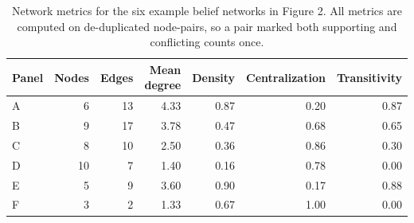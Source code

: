 \begin{table}
\caption{Network metrics for the six example belief networks in Figure 2. All metrics are computed on de-duplicated node-pairs, so a pair marked both supporting and conflicting counts once.}
\label{tab:figure2_examples}
\begin{tabular}{lrrrrrr}
\toprule
Panel & Nodes & Edges & Mean degree & Density & Centralization & Transitivity \\
\midrule
A & 6 & 13 & 4.33 & 0.87 & 0.20 & 0.87 \\
B & 9 & 17 & 3.78 & 0.47 & 0.68 & 0.65 \\
C & 8 & 10 & 2.50 & 0.36 & 0.86 & 0.30 \\
D & 10 & 7 & 1.40 & 0.16 & 0.78 & 0.00 \\
E & 5 & 9 & 3.60 & 0.90 & 0.17 & 0.88 \\
F & 3 & 2 & 1.33 & 0.67 & 1.00 & 0.00 \\
\bottomrule
\end{tabular}
\end{table}
